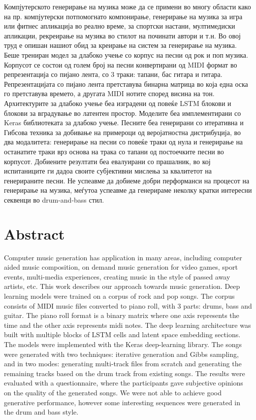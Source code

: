Компјутерското генерирање на музика може да се примени во многу области како на пр. компјутерски потпомогнато компонирање, генерирање на музика за игра или фитнес апликација во реално време, за спортски настани, мултимедиски апликации, рекреирање на музика во стилот на починати автори и т.н. Во овој труд е опишан нашиот обид за креирање на систем за генерирање на музика. Беше трениран модел за длабоко учење со корпус на песни од рок и поп музика. Корпусот се состои од голем број на песни конвертирани од MIDI формат во репрезентација со пијано лента, со 3 траки: тапани, бас гитара и гитара. Репрезентацијата со пијано лента претставува бинарна матрица во која една оска го претставува времето, а другата MIDI нотите според висина на тон. 
Архитектурите за длабоко учење беа изградени од повеќе LSTM блокови и блокови за вградување во латентен простор. Моделите беа имплементирани со Keras библиотеката за длабоко учење. 
Песните беа генерирани со итеративна и Гибсова техника за добивање на примероци од веројатностна дистрибуција, во два модалитета: генерирање на песни со повеќе траки од нула и генерирање на останатите траки врз основа на трака со тапани од постоечките песни во корпусот.
Добиените резултати беа евалуирани со прашалник, во кој испитаниците ги дадоа своите субјективни мислења за квалитетот на генерираните песни. Не успеавме да добиеме добри перформанси на процесот на генерирање на музика, меѓутоа успеавме да генерираме неколку кратки интересни секвенци во drum-and-bass стил.

\chapter*{Abstract}

Computer music generation has application in many areas, including computer aided music composition, on demand music generation for video games, sport events, multi-media experiences, creating music in the style of passed away artists, etc.
This work describes our approach towards music generation. Deep learning models were trained on a corpus of rock and pop songs.
The corpus consists of MIDI music files converted to piano roll, with 3 parts: drums, bass and guitar. The piano roll format is a binary matrix where one axis represents the time and the other axis represents midi notes.
The deep learning architecture was built with multiple blocks of LSTM cells and latent space embedding sections. The models were implemented with the Keras deep-learning library. The songs were generated with two techniques: iterative generation and Gibbs sampling, and in two modes: generating multi-track files from scratch and generating the remaining tracks based on the drum track from existing songs.
The results were evaluated with a questionnaire, where the participants gave subjective opinions on the quality of the generated songs. We were not able to achieve good generative performance, however some interesting sequences were generated in the drum and bass style.

